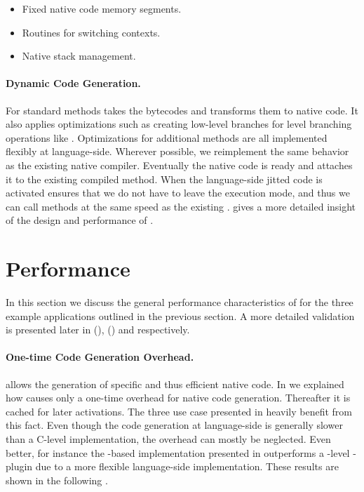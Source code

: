 \begin{itemize}[noitemsep]
	\item Fixed native code memory segments.
	\item Routines for switching contexts.
	\item Native stack management.
\end{itemize}

\paragraph{Dynamic Code Generation.}
For standard methods \Nabujito takes the bytecodes and transforms them to native code.
It also applies optimizations such as creating low-level branches for \PH level branching operations like .
Optimizations for additional methods are all implemented flexibly at language-side.
Wherever possible, we reimplement the same behavior as the existing native \JIT compiler.
Eventually the native code is ready and \B attaches it to the existing compiled method.
When the language-side jitted code is activated \B ensures that we do not have to leave the \JIT execution mode, and thus we can call methods at the same speed as the existing \JIT.
 gives a more detailed insight of the design and performance of \NBJ.


\section{Performance}
In this section we discuss the general performance characteristics of \B for the three example applications outlined in the previous section.
A more detailed validation is presented later in  (\FFI),  (\WF) and  respectively.

\paragraph{One-time Code Generation Overhead.} 
\B allows the generation of specific and thus efficient native code.
In  we explained how \B causes only a one-time overhead for native code generation. 
Thereafter it is cached for later activations.
The three use case presented in  heavily benefit from this fact.
Even though the code generation at language-side is generally slower than a C-level implementation, the overhead can mostly be neglected.
Even better, for instance the \B-based \FFI implementation presented in  outperforms a \VM-level \FFI-plugin due to a more flexible language-side implementation. 
These results are shown in the following .

